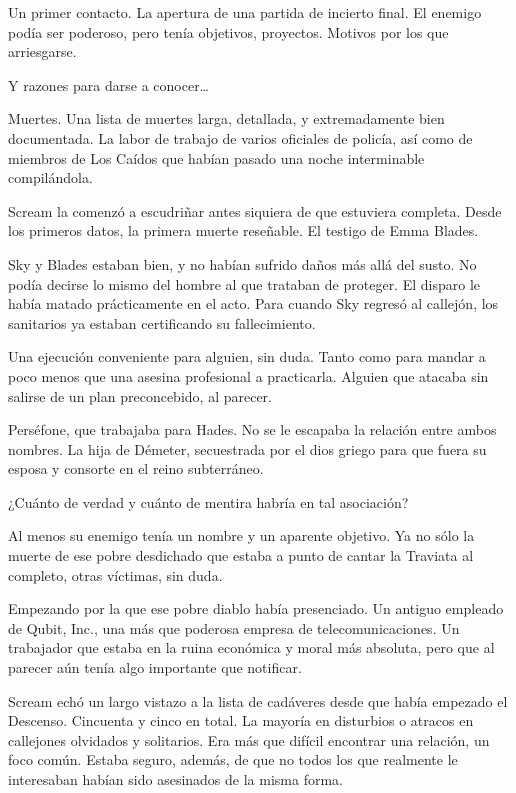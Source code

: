 Un primer contacto. La apertura de una partida de incierto final. El enemigo podía ser poderoso, pero tenía objetivos, proyectos. Motivos por los que arriesgarse.

Y razones para darse a conocer\dots
 
\fancyparbreak
Muertes. Una lista de muertes larga, detallada, y extremadamente bien documentada. La labor de trabajo de varios oficiales de policía, así como de miembros de Los Caídos que habían pasado una noche interminable compilándola.

Scream la comenzó a escudriñar antes siquiera de que estuviera completa. Desde los primeros datos, la primera muerte reseñable. El testigo de Emma Blades.

Sky y Blades estaban bien, y no habían sufrido daños más allá del susto. No podía decirse lo mismo del hombre al que trataban de proteger. El disparo le había matado prácticamente en el acto. Para cuando Sky regresó al callejón, los sanitarios ya estaban certificando su fallecimiento.

Una ejecución conveniente para alguien, sin duda. Tanto como para mandar a poco menos que una asesina profesional a practicarla. Alguien que atacaba sin salirse de un plan preconcebido, al parecer.

Perséfone, que trabajaba para Hades. No se le escapaba la relación entre ambos nombres. La hija de Démeter, secuestrada por el dios griego para que fuera su esposa y consorte en el reino subterráneo.

¿Cuánto de verdad y cuánto de mentira habría en tal asociación?

Al menos su enemigo tenía un nombre y un aparente objetivo. Ya no sólo la muerte de ese pobre desdichado que estaba a punto de cantar la Traviata al completo, otras víctimas, sin duda.

Empezando por la que ese pobre diablo había presenciado. Un antiguo empleado de Qubit, Inc., una más que poderosa empresa de telecomunicaciones. Un trabajador que estaba en la ruina económica y moral más absoluta, pero que al parecer aún tenía algo importante que notificar.

Scream echó un largo vistazo a la lista de cadáveres desde que había empezado el Descenso. Cincuenta y cinco en total. La mayoría en disturbios o atracos en callejones olvidados y solitarios. Era más que difícil encontrar una relación, un foco común. Estaba seguro, además, de que no todos los que realmente le interesaban habían sido asesinados de la misma forma.

